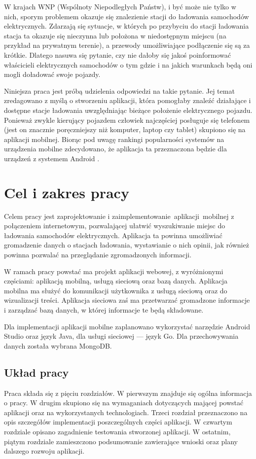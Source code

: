 W krajach WNP (Wspólnoty Niepodległych Państw), i być może nie tylko w nich, sporym problemem okazuje się znalezienie stacji do ładowania samochodów elektrycznych. Zdarzają się sytuacje, w których po przybyciu do stacji ładowania stacja ta okazuje się nieczynna lub położona w niedostępnym miejscu (na przykład na prywatnym terenie), a przewody umożliwiające podłączenie się są za krótkie. Dlatego nasuwa się pytanie, czy nie dałoby się jakoś poinformować właścicieli elektrycznych samochodów o tym gdzie i na jakich warunkach będą oni mogli doładować swoje pojazdy. 

Niniejsza praca jest próbą udzielenia odpowiedzi na takie pytanie. Jej temat zredagowano z myślą o stworzeniu aplikacji, która pomogłaby znaleźć działające i dostępne stacje ładowania uwzględniając bieżące położenie elektrycznego pojazdu. Ponieważ zwykle kierujący pojazdem człowiek najczęściej posługuje się telefonem (jest on znacznie poręczniejszy niż komputer, laptop czy tablet) skupiono się na aplikacji mobilnej. Biorąc pod uwagę rankingi popularności systemów na urządzenia mobilne zdecydowano, że aplikacja ta przeznaczona będzie dla urządzeń z systemem Android \cite{avi1}.


\section{Cel i zakres pracy}
Celem pracy jest zaprojektowanie i zaimplementowanie aplikacji mobilnej z połączeniem internetowym, pozwalającej ułatwić wyszukiwanie miejsc do ładowania samochodów elektrycznych. Aplikacja ta powinna umożliwiać gromadzenie danych o stacjach ładowania, wystawianie o nich opinii, jak również powinna pozwalać na przeglądanie zgromadzonych informacji. 

W ramach pracy powstać ma projekt aplikacji webowej, z wyróżnionymi częściami: aplikacją mobilną, usługą sieciową oraz bazą danych.
Aplikacja mobilna ma służyć do komunikacji użytkownika z usługą sieciową oraz do wizualizacji treści.
Aplikacja sieciowa zaś ma przetwarzać gromadzone informacje i zarządzać bazą danych, w której informacje te będą składowane.

Dla implementacji aplikacji mobilne zaplanowano wykorzystać narzędzie Android Studio oraz język Java, dla usługi sieciowej — język Go. Dla przechowywania danych została wybrana MongoDB.

\subsection{Układ pracy}
Praca składa się z pięciu rozdziałów. W pierwszym znajduje się ogólna informacja o pracy.
W drugim skupiono się na wymaganiach dotyczących mającej powstać aplikacji oraz na wykorzystanych technologiach.
Trzeci rozdział przeznaczono na opis szczegółów implementacji poszczególnych części aplikacji.
W czwartym rozdziale opisano zagadnienie testowania stworzonej aplikacji.
W ostatnim, piątym rozdziale zamieszczono podsumowanie zawierające wnioski oraz plany dalszego rozwoju aplikacji.
